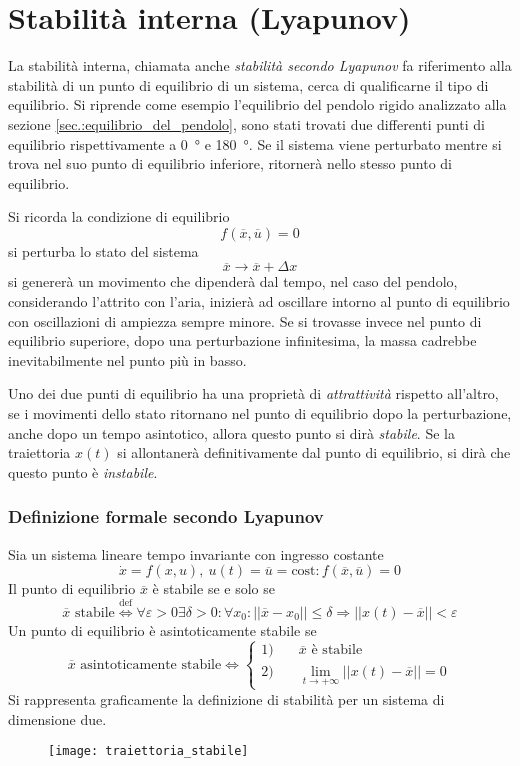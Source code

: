 
\section{Stabilità interna (Lyapunov)}
La stabilità interna, chiamata anche \textit{stabilità secondo Lyapunov} fa
riferimento alla stabilità di un punto di equilibrio di un sistema, cerca di
qualificarne il tipo di equilibrio.
Si riprende come esempio l'equilibrio del pendolo rigido analizzato alla
sezione \ref{sec.:equilibrio_del_pendolo},
sono stati trovati due differenti punti di equilibrio rispettivamente a
\SI{0}{\degree} e \SI{180}{\degree}.
Se il sistema viene perturbato mentre si trova nel suo punto di equilibrio
inferiore, ritornerà nello stesso punto di equilibrio.

Si ricorda la condizione di equilibrio
$$
f(\overline{x},\overline{u})=0
$$
si perturba lo stato del sistema
$$
\overline{x}\to\overline{x}+\Delta x
$$
si genererà un movimento che dipenderà dal tempo, nel caso del pendolo,
considerando l'attrito con l'aria, inizierà ad oscillare intorno al punto di
equilibrio con oscillazioni di ampiezza sempre minore.
Se si trovasse invece nel punto di equilibrio superiore, dopo una perturbazione
infinitesima, la massa cadrebbe inevitabilmente nel punto più in basso.

Uno dei due punti di equilibrio ha una proprietà di \textit{attrattività}
rispetto all'altro, se i movimenti dello stato ritornano nel punto di
equilibrio dopo la perturbazione, anche dopo un tempo asintotico, allora questo
punto si dirà \textit{stabile}.
Se la traiettoria $x(t)$ si allontanerà definitivamente dal punto di
equilibrio, si dirà che questo punto è \textit{instabile}.

\subsubsection{Definizione formale secondo Lyapunov}
Sia un sistema lineare tempo invariante con ingresso costante
$$
\dot{x} = f(x,u),\ u(t) = \overline{u} = \text{cost} :
f(\overline{x},\overline{u}) = 0
$$
Il punto di equilibrio $\overline{x}$ è stabile
se e solo se
$$
\overline{x} \text{ stabile} \stackrel{\text{def}}{\Leftrightarrow}
\forall\varepsilon > 0 \exists\delta>0: \forall x_0 : ||\overline{x}-x_0||
\leq\delta \Rightarrow ||x(t)-\overline{x}||<\varepsilon
$$
Un punto di equilibrio è asintoticamente stabile se
$$
\overline{x} \text{ asintoticamente stabile}
\Leftrightarrow \left\{
\begin{aligned}
1) &\quad \overline{x} \text{ è stabile}\\
2) &\quad \lim_{t\to+\infty} ||x(t)-\overline{x}||=0
\end{aligned}
\right.
$$
\newpage
Si rappresenta graficamente la definizione di stabilità per un sistema di
dimensione due.
\begin{figure}[h]
\centering
\texttt{[image: traiettoria\_stabile]}
\end{figure}

